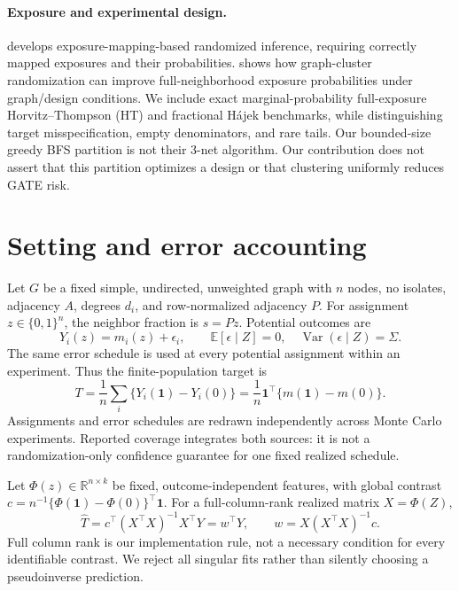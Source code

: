 \documentclass{article}
\newcommand{\E}{\mathbb E}
\newcommand{\Var}{\operatorname{Var}}
\newcommand{\one}{\mathbf 1}
\newcommand{\R}{\mathbb R}
\begin{document}
\paragraph{Exposure and experimental design.}
\citet{aronow} develops exposure-mapping-based randomized inference, requiring correctly mapped exposures and their probabilities. \citet{ugander} shows how graph-cluster randomization can improve full-neighborhood exposure probabilities under graph/design conditions. We include exact marginal-probability full-exposure Horvitz--Thompson (HT) and fractional H\'ajek benchmarks, while distinguishing target misspecification, empty denominators, and rare tails. Our bounded-size greedy BFS partition is not their 3-net algorithm. Our contribution does not assert that this partition optimizes a design or that clustering uniformly reduces GATE risk.

\section{Setting and error accounting}\label{sec:method}
Let $G$ be a fixed simple, undirected, unweighted graph with $n$ nodes, no isolates, adjacency $A$, degrees $d_i$, and row-normalized adjacency $P$. For assignment $z\in\{0,1\}^n$, the neighbor fraction is $s=Pz$. Potential outcomes are
\begin{equation}\label{eq:potential}
Y_i(z)=m_i(z)+\epsilon_i,\qquad \E[\epsilon\mid Z]=0,\quad \Var(\epsilon\mid Z)=\Sigma.
\end{equation}
The same error schedule is used at every potential assignment within an experiment. Thus the finite-population target is
\begin{equation}\label{eq:gate}
T=\frac1n\sum_i\{Y_i(\one)-Y_i(0)\}=\frac1n\one^\top\{m(\one)-m(0)\}.
\end{equation}
Assignments and error schedules are redrawn independently across Monte Carlo experiments. Reported coverage integrates both sources: it is not a randomization-only confidence guarantee for one fixed realized schedule.

Let $\Phi(z)\in\R^{n\times k}$ be fixed, outcome-independent features, with global contrast $c=n^{-1}\{\Phi(\one)-\Phi(0)\}^{\top}\one$. For a full-column-rank realized matrix $X=\Phi(Z)$,
\begin{equation}\label{eq:ols}
\widehat T=c^\top(X^\top X)^{-1}X^\top Y=w^\top Y,\qquad w=X(X^\top X)^{-1}c.
\end{equation}
Full column rank is our implementation rule, not a necessary condition for every identifiable contrast. We reject all singular fits rather than silently choosing a pseudoinverse prediction.
\end{document}
